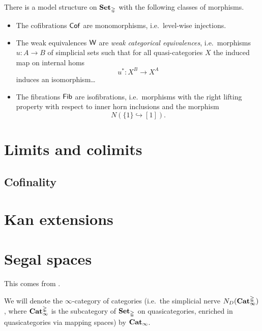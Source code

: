 \documentclass[main.tex]{subfiles}
\begin{document}
\begin{definition}
  \label{def:joyal_model_structure}
  There is a model structure on $\mathbf{Set}_{\mathbb{\Delta}}$ with the following classes of morphisms.
  \begin{itemize}
    \item The cofibrations $\mathsf{Cof}$ are monomorphisms, i.e.\ level-wise injections.

    \item The weak equivalences $\mathsf{W}$ are \emph{weak categorical equivalences}, i.e.\ morphisms $u\colon A \to B$ of simplicial sets such that for all quasi-categories $X$ the induced map on internal homs
      \begin{equation*}
        u^{*}\colon X^{B} \to X^{A}
      \end{equation*}
      induces an isomorphism\dots

    \item The fibrations $\mathsf{Fib}$ are isofibrations, i.e.\ morphisms with the right lifting property with respect to inner horn inclusions and the morphism
      \begin{equation*}
        N\left(\{1\} \hookrightarrow [1]\right).
      \end{equation*}
  \end{itemize}
\end{definition}

\section{Limits and colimits}
\label{sec:limits_and_colimits}

\subsection{Cofinality}
\label{ssc:cofinality}


\section{Kan extensions}
\label{sec:kan_extensions}


\section{Segal spaces}
\label{sec:segal_spaces}

This comes from \cite{1409.0837}.

We will denote the $\infty$-category of categories (i.e.\ the simplicial nerve $N_{D}(\mathbf{Cat}^{\mathbb{\Delta}}_{\infty})$, where $\mathbf{Cat}^{\mathbb{\Delta}}_{\infty}$ is the subcategory of $\mathbf{Set}_{\mathbb{\Delta}}$ on quasicategories, enriched in quasicategories via mapping spaces) by $\mathbf{Cat}_{\infty}$.
\end{document}
